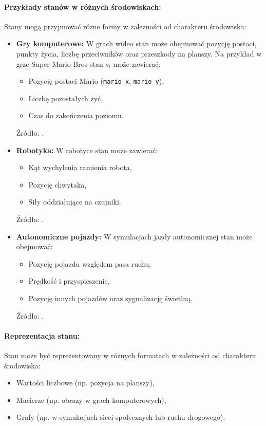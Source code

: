 \paragraph{Przykłady stanów w różnych środowiskach:}
Stany mogą przyjmować różne formy w zależności od charakteru środowiska:
\begin{itemize}
	\item \textbf{Gry komputerowe:} W grach wideo stan może obejmować pozycję postaci, punkty życia, liczbę przeciwników oraz przeszkody na planszy. Na przykład w grze Super Mario Bros stan \( s_t \) może zawierać:
	      \begin{itemize}
		      \item Pozycję postaci Mario (\texttt{mario\_x}, \texttt{mario\_y}),
		      \item Liczbę pozostałych żyć,
		      \item Czas do zakończenia poziomu.
	      \end{itemize}
	      Źródło: \cite{BELLEMARE2013, KARPATHY2015}.

	\item \textbf{Robotyka:} W robotyce stan może zawierać:
	      \begin{itemize}
		      \item Kąt wychylenia ramienia robota,
		      \item Pozycję chwytaka,
		      \item Siły oddziałujące na czujniki.
	      \end{itemize}
	      Źródło: \cite{TODOROV2012, SCHULMAN2017}.

	\item \textbf{Autonomiczne pojazdy:} W symulacjach jazdy autonomicznej stan może obejmować:
	      \begin{itemize}
		      \item Pozycję pojazdu względem pasa ruchu,
		      \item Prędkość i przyspieszenie,
		      \item Pozycję innych pojazdów oraz sygnalizację świetlną.
	      \end{itemize}
	      Źródło: \cite{DOSOVITSKIY2017}.
\end{itemize}

\paragraph{Reprezentacja stanu:}
Stan może być reprezentowany w różnych formatach w zależności od charakteru środowiska:
\begin{itemize}
	\item Wartości liczbowe (np. pozycja na planszy),
	\item Macierze (np. obrazy w grach komputerowych),
	\item Grafy (np. w symulacjach sieci społecznych lub ruchu drogowego).
\end{itemize}

